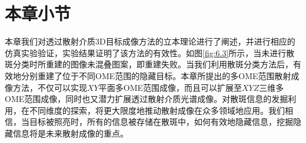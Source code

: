 \section{本章小节}
本章我们对透过散射介质3D目标成像方法的立本理论进行了阐述，并进行相应的仿真实验验证，实验结果证明了该方法的有效性。如图\ref{fig:6.3}所示，当未进行散斑分类时所重建的图像未混叠图案，即重建失败。当我们利用散斑分类方法后，有效地分别重建了位于不同OME范围的隐藏目标。本章所提出的多OME范围散射成像方法，不仅可以实现$XY$平面多OME范围成像，而且可以扩展至$XYZ$三维多OME范围成像，同时也又潜力扩展透过散射介质光谱成像。对散斑信息的发掘利用，在不同维度的探索，将更大限度地推动散射成像在众多领域地应用。我们相信，当目标被照亮时，所有的信息被存储在散斑中，如何有效地隐藏信息，挖掘隐藏信息将是未来散射成像的重点。
